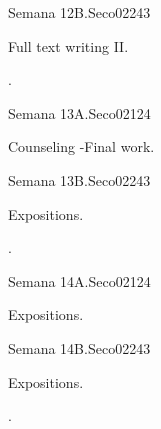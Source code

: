 \begin{syllabus}
\begin{unit}{Semana 12B.}{}{Seco02}{24}{3}
   \begin{topics}
      \item Full text writing II.
   \end{topics}

   \begin{learningoutcomes}
      \item .
      \end{learningoutcomes}
\end{unit}


\begin{unit}{Semana 13A.}{}{Seco02}{12}{4}
   \begin{topics}
      \item Counseling -Final work.
   \end{topics}
   \begin{learningoutcomes}
      \item 
   \end{learningoutcomes}
\end{unit}

\begin{unit}{Semana 13B.}{}{Seco02}{24}{3}
   \begin{topics}
      \item Expositions.
   \end{topics}

   \begin{learningoutcomes}
      \item .
      \end{learningoutcomes}
\end{unit}


\begin{unit}{Semana 14A.}{}{Seco02}{12}{4}
   \begin{topics}
      \item Expositions.
   \end{topics}
   \begin{learningoutcomes}
      \item 
   \end{learningoutcomes}
\end{unit}

\begin{unit}{Semana 14B.}{}{Seco02}{24}{3}
   \begin{topics}
      \item Expositions.
   \end{topics}

   \begin{learningoutcomes}
      \item .
      \end{learningoutcomes}
\end{unit}


\end{syllabus}
